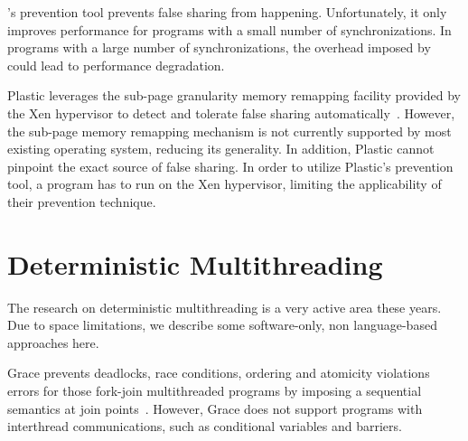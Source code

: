 \Sheriff{}'s prevention tool prevents false sharing from happening. Unfortunately, it only improves performance for programs with a small number of synchronizations. 
In programs with a large number of synchronizations, the overhead imposed by \Sheriff{} could lead to performance degradation.

Plastic leverages the sub-page granularity memory remapping facility provided by the Xen hypervisor to detect and tolerate false sharing automatically~\cite{OSdetection}. However, the sub-page memory remapping mechanism is not currently supported by most existing operating system, reducing its generality. In addition, Plastic cannot pinpoint the exact source of false sharing.  
In order to utilize Plastic's prevention tool, a program has to run on the Xen hypervisor, limiting the applicability of their prevention technique.

\section{Deterministic Multithreading}
The research on deterministic multithreading is a very active area these years. 
Due to space limitations, we describe some software-only,
non language-based approaches here.

Grace prevents deadlocks, race conditions, ordering and atomicity violations errors
for those fork-join multithreaded programs by imposing a sequential semantics 
at join points~\cite{grace}. 
However, Grace does not support programs with interthread communications, such as
conditional variables and barriers.

